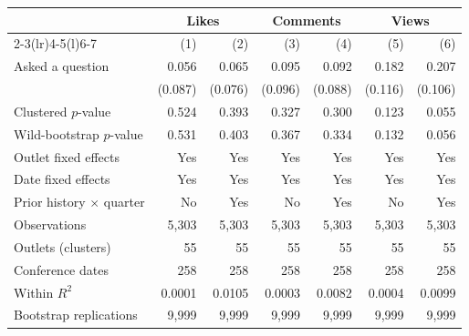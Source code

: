 \begingroup\centering\small
\setlength{\tabcolsep}{3pt}
\renewcommand{\arraystretch}{1.05}
\begin{tabular*}{\linewidth}{@{\extracolsep{\fill}}lrrrrrr@{}}
\toprule
 & \multicolumn{2}{c}{Likes} & \multicolumn{2}{c}{Comments} & \multicolumn{2}{c}{Views} \\
\cmidrule(lr){2-3}\cmidrule(lr){4-5}\cmidrule(l){6-7}
 & (1) & (2) & (3) & (4) & (5) & (6) \\
\midrule
Asked a question & 0.056 & 0.065 & 0.095 & 0.092 & 0.182 & 0.207 \\
 & (0.087) & (0.076) & (0.096) & (0.088) & (0.116) & (0.106) \\
Clustered $p$-value & 0.524 & 0.393 & 0.327 & 0.300 & 0.123 & 0.055 \\
Wild-bootstrap $p$-value & 0.531 & 0.403 & 0.367 & 0.334 & 0.132 & 0.056 \\
\midrule
Outlet fixed effects & Yes & Yes & Yes & Yes & Yes & Yes \\
Date fixed effects & Yes & Yes & Yes & Yes & Yes & Yes \\
Prior history $\times$ quarter & No & Yes & No & Yes & No & Yes \\
\addlinespace[3pt]
Observations & 5,303 & 5,303 & 5,303 & 5,303 & 5,303 & 5,303 \\
Outlets (clusters) & 55 & 55 & 55 & 55 & 55 & 55 \\
Conference dates & 258 & 258 & 258 & 258 & 258 & 258 \\
Within $R^2$ & 0.0001 & 0.0105 & 0.0003 & 0.0082 & 0.0004 & 0.0099 \\
Bootstrap replications & 9,999 & 9,999 & 9,999 & 9,999 & 9,999 & 9,999 \\
\bottomrule
\end{tabular*}\par\endgroup
